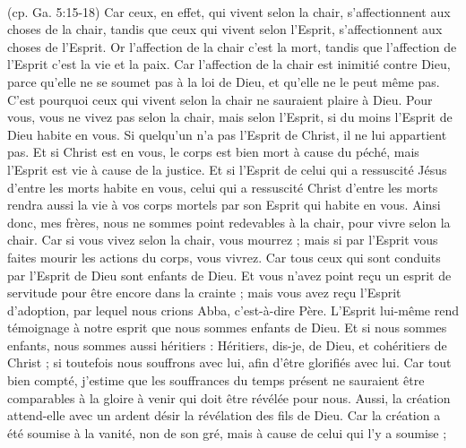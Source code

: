 \begin{multicols}{2}
{\\(cp. Ga. 5:15-18)}
Car ceux, en effet, qui vivent selon la chair, s’affectionnent aux choses de la chair, tandis que ceux qui vivent selon l'Esprit, s’affectionnent aux choses de l'Esprit.
Or l'affection de la chair c’est la mort, tandis que l'affection de l'Esprit c’est la vie et la paix.
Car l'affection de la chair est inimitié contre Dieu, parce qu’elle ne se soumet pas à la loi de Dieu, et qu’elle ne le peut même pas.
C'est pourquoi ceux qui vivent selon la chair ne sauraient plaire à Dieu.
Pour vous, vous ne vivez pas selon la chair, mais selon l'Esprit, si du moins l'Esprit de Dieu habite en vous. Si quelqu'un n'a pas l'Esprit de Christ, il ne lui appartient pas.
Et si Christ est en vous, le corps est bien mort à cause du péché, mais l'Esprit est vie à cause de la justice.
Et si l'Esprit de celui qui a ressuscité Jésus d’entre les morts habite en vous, celui qui a ressuscité Christ d’entre les morts rendra aussi la vie à vos corps mortels par son Esprit qui habite en vous.
Ainsi donc, mes frères, nous ne sommes point redevables à la chair, pour vivre selon la chair.
Car si vous vivez selon la chair, vous mourrez ; mais si par l'Esprit vous faites mourir les actions du corps, vous vivrez.
Car tous ceux qui sont conduits par l'Esprit de Dieu sont enfants de Dieu.
Et vous n'avez point reçu un esprit de servitude pour être encore dans la crainte ; mais vous avez reçu l'Esprit d'adoption, par lequel nous crions Abba, c'est-à-dire Père.
L’Esprit lui-même rend témoignage à notre esprit que nous sommes enfants de Dieu.
Et si nous sommes enfants, nous sommes aussi héritiers : Héritiers, dis-je, de Dieu, et cohéritiers de Christ ; si toutefois nous souffrons avec lui, afin d’être glorifiés avec lui.
Car tout bien compté, j'estime que les souffrances du temps présent ne sauraient être comparables à la gloire à venir qui doit être révélée pour nous.
Aussi, la création attend-elle avec un ardent désir la révélation des fils de Dieu.
Car la création a été soumise à la vanité, non de son gré, mais à cause de celui qui l’y a soumise ;

\end{multicols}
